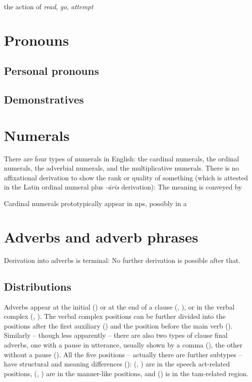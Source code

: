 \documentclass[UTF8, a4paper, oneside, scheme=plain]{ctexrep}
\newcommand{\corpus}[1]{\emph{#1}}
\begin{document}
the action of \corpus{read}, \corpus{go}, \corpus{attempt}

\section{Pronouns}

\subsection{Personal pronouns}

\subsection{Demonstratives}

\section{Numerals}

There are four types of numerals in English:
the cardinal numerals, 
the ordinal numerals,
the adverbial numerals,
and the multiplicative numerals.
There is no affixational derivation to show the rank or quality of something 
(which is attested in the Latin ordinal numeral plus \corpus{-āris} derivation):
The meaning is conveyed by 

Cardinal numerals prototypically appear in \acs{np}s,
possibly in a 

\section{Adverbs and adverb phrases}\label{sec:pos.adverb}

Derivation into adverbs is terminal:
No further derivation is possible after that.

\subsection{Distributions}

Adverbs appear at the initial () or
at the end of a clause (, ), 
or in the verbal complex (, ).
The verbal complex positions can be further divided into 
the positions after the first auxiliary ()
and the position before the main verb ().
Similarly -- though less apparently -- 
there are also two types of clause final adverbs,
one with a pause in utterance, usually shown by a comma (),
the other without a pause ().
All the five positions -- actually there are further subtypes -- have structural and meaning differences
():
(, ) 
are in the speech act-related positions,
(, ) 
are in the manner-like positions,
and () 
is in the \acs{tam}-related region.
\end{document}
